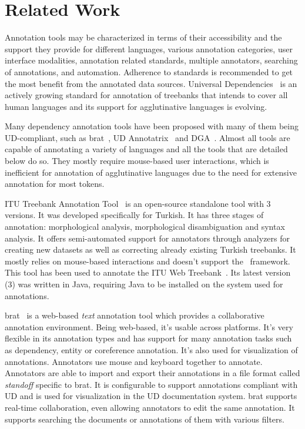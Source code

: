 \section{Related Work}
\label{sec:related}

Annotation tools may be characterized in terms of their accessibility and the support they provide for different languages, various annotation categories, user interface modalities, annotation related standards, multiple annotators, searching of annotations, and automation.
Adherence to standards is recommended to get the most benefit from the annotated data sources.
Universal Dependencies~\cite{UD} is an actively growing standard for annotation of treebanks that intends to cover all human languages and its support for agglutinative languages is evolving.

Many dependency annotation tools have been proposed with many of them being UD-compliant, such as brat~\cite{brat}, UD Annotatrix~\cite{ud-annotatrix} and DGA~\cite{dgannotator}.
Almost all tools are capable of annotating a variety of languages and all the tools that are detailed below do so.
They mostly require mouse-based user interactions, which is inefficient for annotation of agglutinative languages due to the need for extensive annotation for most tokens.

ITU Treebank Annotation Tool~\cite{itu-annotation-tool} is an open-source standalone tool with 3 versions.
It was developed specifically for Turkish.
It has three stages of annotation: morphological analysis, morphological disambiguation and syntax analysis.
It offers semi-automated support for annotators through analyzers for creating new datasets as well as correcting already existing Turkish treebanks.
It mostly relies on mouse-based interactions and doesn't support the \ud\ framework.
This tool has been used to annotate the ITU Web Treebank~\cite{itu-web-tb}.
Its latest version (3) was written in Java, requiring Java to be installed on the system used for annotations.

brat~\cite{brat} is a web-based \textit{text} annotation tool which provides a collaborative annotation environment.
Being web-based, it's usable across platforms.
It's very flexible in its annotation types and has support for many annotation tasks such as dependency, entity or coreference annotation.
It's also used for visualization of annotations.
Annotators use mouse and keyboard together to annotate.
Annotators are able to import and export their annotations in a file format called \textit{standoff} specific to brat.
It is configurable to support annotations compliant with UD and is used for visualization in the UD documentation system.
brat supports real-time collaboration, even allowing annotators to edit the same annotation.
It supports searching the documents or annotations of them with various filters.

